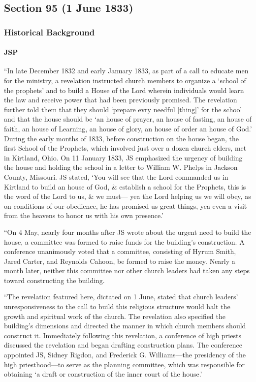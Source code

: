 \subsection{Section 95 (1 June 1833)}
	\label{DC95}
	
	\subsubsection{Historical Background}
		\label{DC95-HB}
		
		\paragraph{JSP}
		
			``In late December 1832 and early January 1833, as part of a call to educate men for the ministry, a revelation instructed church members to organize a `school of the prophets' and to build a House of the Lord wherein individuals would learn the law and receive power that had been previously promised. The revelation further told them that they should `prepare evry needful [thing]' for the school and that the house should be `an house of prayer, an house of fasting, an house of faith, an house of Learning, an house of glory, an house of order an house of God.' During the early months of 1833, before construction on the house began, the first School of the Prophets, which involved just over a dozen church elders, met in Kirtland, Ohio. On 11 January 1833, JS emphasized the urgency of building the house and holding the school in a letter to William W. Phelps in Jackson County, Missouri. JS stated, `You will see that the Lord commanded us in Kirtland to build an house of God, \& establish a school for the Prophets, this is the word of the Lord to us, \& we must--- yea the Lord helping us we will obey, as on conditions of our obedience, he has promised us great things, yea even a visit from the heavens to honor us with his own presence.'
			
			``On 4 May, nearly four months after JS wrote about the urgent need to build the house, a committee was formed to raise funds for the building's construction. A conference unanimously voted that a committee, consisting of Hyrum Smith, Jared Carter, and Reynolds Cahoon, be formed to raise the money. Nearly a month later, neither this committee nor other church leaders had taken any steps toward constructing the building.
			
			``The revelation featured here, dictated on 1 June, stated that church leaders' unresponsiveness to the call to build this religious structure would halt the growth and spiritual work of the church. The revelation also specified the building's dimensions and directed the manner in which church members should construct it. Immediately following this revelation, a conference of high priests discussed the revelation and began drafting construction plans. The conference appointed JS, Sidney Rigdon, and Frederick G. Williams---the presidency of the high priesthood---to serve as the planning committee, which was responsible for obtaining `a draft or construction of the inner court of the house.'
			
